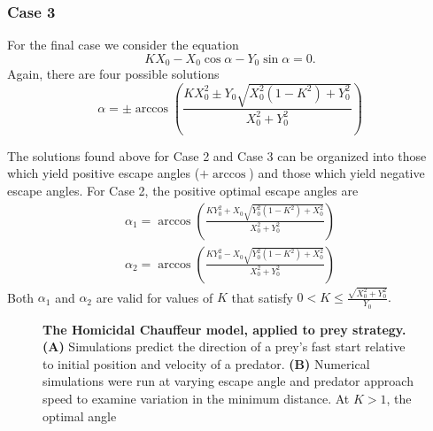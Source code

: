\documentclass[12pt]{article}
\def\ds{\displaystyle}
\begin{document}
\subsubsection{Case 3}
For the final case we consider the equation 
%
\begin{equation}
K X_0 - X_0 \cos \alpha - Y_0 \sin\alpha = 0.
\end{equation}
%
Again, there are four possible solutions
%
\begin{equation}
\alpha = \pm \arccos \left( \frac{K X_0^2 \pm Y_0 
\ds \sqrt{X_0^2(1-K^2) +Y_0^2}}{X_0^2+Y_0^2} \right )
\end{equation}
%

The solutions found above for Case 2 and Case 3 can be organized into those which yield positive escape angles ($+ \arccos$) and those which yield negative escape angles. For Case 2, the positive optimal escape angles are 
%
\begin{align}
\alpha_{1} =  \arccos \left( \frac{K Y_0^2 +X_0 
\ds\sqrt{Y_0^2(1- K^2) + X_0^2 }}{X_0^2+Y_0^2} \right )
\tag{15a} \label{root_a} \\
\alpha_{2} = \arccos \left(\frac{K Y_0^2 - X_0 
\ds\sqrt{Y_0^2(1- K^2) + X_0^2 }}{X_0^2+Y_0^2} \right )
\tag{15b} \label{root_b}
\end{align}
%
Both $\alpha_1$ and $\alpha_2$ are valid for values of $K$ that satisfy 
$0< K \leq \ds \frac{\sqrt{X_0^2 + Y_0^2}}{Y_0}.$






\begin{figure}[t!]
\begin{centering}
\centering	
\caption{\textbf{The Homicidal Chauffeur model, applied to prey strategy.} \textbf{(A)} Simulations predict the direction of a prey's fast start relative to initial position and velocity of a predator. \textbf{(B)} Numerical simulations were run at varying escape angle and predator approach speed to examine variation in the minimum distance. At $K>1$, the optimal angle }
\label{weihs_topo}
\end{centering}
\end{figure}

\pagebreak
\end{document}
